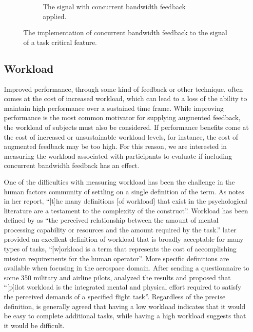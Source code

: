 \begin{figure}[p]
\begin{center}
\begin{subfigure}{0.7\linewidth}
            \caption[The signal with concurrent bandwidth feedback applied]{The signal with concurrent bandwidth feedback applied.}
            \label{fig:signal_w_feedback}
        \end{subfigure}
        \caption[The implementation of concurrent bandwidth feedback to the signal of a task critical feature]{The implementation of concurrent bandwidth feedback to the signal of a task critical feature.}
        \label{fig:cbf}%
    \end{center}
\end{figure}

\subsection{Workload}
Improved performance, through some kind of feedback or other technique, often comes at the cost of increased workload, which can lead to a loss of the ability to maintain high performance over a sustained time frame.
While improving performance is the most common motivator for supplying augmented feedback, the workload of subjects must also be considered.
If performance benefits come at the cost of increased or unsustainable workload levels, for instance, the cost of augmented feedback may be too high.
For this reason, we are interested in measuring the workload associated with participants to evaluate if including concurrent bandwidth feedback has an effect.

One of the difficulties with measuring workload has been the challenge in the human factors community of settling on a single definition of the term.
As \citeauthor{hart_nasa-task_2006} notes in her \citeyear{hart_nasa-task_2006} report, ``[t]he many definitions [of workload] that exist in the psychological literature are a testament to the complexity of the construct''.
Workload has been defined by \citeauthor{hart_development_1988} as ``the perceived relationship between the amount of mental processing capability or resources and the amount required by the task.''
\citeauthor{hart_nasa-task_2006} later provided an excellent definition of workload that is broadly acceptable for many types of tasks, ``[w]orkload is a term that represents the cost of accomplishing mission requirements for the human operator''.
More specific definitions are available when focusing in the aerospace domain.
After sending a questionnaire to some 350 military and airline pilots, \citeauthor{ellis1982airline} analyzed the results and proposed that ``[p]ilot workload is the integrated mental and physical effort required to satisfy the perceived demands of a specified flight task''.
Regardless of the precise definition, is generally agreed that having a low workload indicates that it would be easy to complete additional tasks, while having a high workload suggests that it would be difficult.

